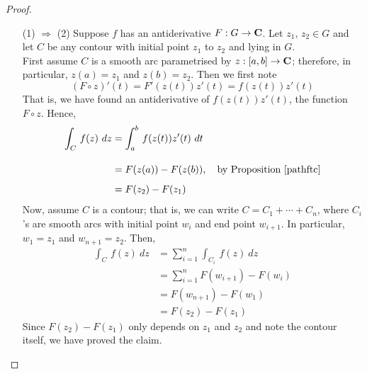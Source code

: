\begin{proof}\hfill
\begin{itemize}[leftmargin=4.5em,itemsep=1.5em]
\item[(1) $\Rightarrow$ (2)] Suppose $f$ has an antiderivative $F: G \to \mathbf C$. Let $z_1,\,z_2 \in G$ and let $C$ be any contour with initial point $z_1$ to $z_2$ and lying in $G$.\\[0.5em]
First assume $C$ is a smooth arc parametrised by $z:[a,b] \to \mathbf C$; therefore, in particular, $z(a) = z_1$ and $z(b) = z_2$. Then we first note
\[(F\circ z)'(t) = F'(z(t))z'(t) = f(z(t))z'(t)\]
That is, we have found an antiderivative of $f(z(t))z'(t)$, the function $F\circ z$. Hence, 
\begin{align*}
\int_C\,f(z)\ dz &= \int_a^b\,f(z(t))z'(t)\ dt\\[1em]
&= F(z(a)) - F(z(b)),\quad \text{by Proposition \ref{pathftc}}\\[0.5em]
&= F(z_2) - F(z_1)
\end{align*}
Now, assume $C$ is a contour; that is, we can write $C = C_1 + \cdots + C_n$, where $C_i$'s are smooth arcs with initial point $w_i$ and end point $w_{i + 1}$. In particular, $w_1 = z_1$ and $w_{n+1} = z_2$. Then,
\begin{align*}
\int_C\,f(z)\ dz &= \sum_{i=1}^n\int_{C_i}\,f(z)\ dz\\[1em]
 &= \sum_{i=1}^n F(w_{i+1}) - F(w_i)\\[0.5em]
 &= F(w_{n+1}) - F(w_1)\\[0.5em]
 &= F(z_2) - F(z_1)
\end{align*}
Since $F(z_2) - F(z_1)$ only depends on $z_1$ and $z_2$ and note the contour itself, we have proved the claim.


\end{itemize}
\end{proof}
